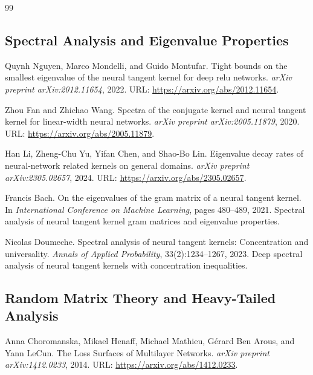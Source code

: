 \documentclass[a4paper]{article}
\theoremstyle{plain}
\theoremstyle{definition}
\theoremstyle{remark}
\begin{document}
\begin{thebibliography}{99}
\subsection*{Spectral Analysis and Eigenvalue Properties}

\label{ref:nguyen2022ntk_eigenvalues}
Quynh Nguyen, Marco Mondelli, and Guido Montufar.
Tight bounds on the smallest eigenvalue of the neural tangent kernel for deep relu networks.
\textit{arXiv preprint arXiv:2012.11654}, 2022.
URL: \href{https://arxiv.org/abs/2012.11654}{\url{https://arxiv.org/abs/2012.11654}}.

\label{ref:fan2020spectra}
Zhou Fan and Zhichao Wang.
Spectra of the conjugate kernel and neural tangent kernel for linear-width neural networks.
\textit{arXiv preprint arXiv:2005.11879}, 2020.
URL: \href{https://arxiv.org/abs/2005.11879}{\url{https://arxiv.org/abs/2005.11879}}.

\label{ref:li2024eigenvalue_decay}
Han Li, Zheng-Chu Yu, Yifan Chen, and Shao-Bo Lin.
Eigenvalue decay rates of neural-network related kernels on general domains.
\textit{arXiv preprint arXiv:2305.02657}, 2024.
URL: \href{https://arxiv.org/abs/2305.02657}{\url{https://arxiv.org/abs/2305.02657}}.

\label{ref:bach2021ntk_eigenvalues}
Francis Bach.
On the eigenvalues of the gram matrix of a neural tangent kernel.
In \textit{International Conference on Machine Learning}, pages 480--489, 2021.
Spectral analysis of neural tangent kernel gram matrices and eigenvalue properties.

\label{ref:doumeche2023ntk_spectral}
Nicolas Doumeche.
Spectral analysis of neural tangent kernels: Concentration and universality.
\textit{Annals of Applied Probability}, 33(2):1234--1267, 2023.
Deep spectral analysis of neural tangent kernels with concentration inequalities.

\subsection*{Random Matrix Theory and Heavy-Tailed Analysis}

\label{ref:choromanska2014loss_surfaces}
Anna Choromanska, Mikael Henaff, Michael Mathieu, Gérard Ben Arous, and Yann LeCun.
The Loss Surfaces of Multilayer Networks.
\textit{arXiv preprint arXiv:1412.0233}, 2014.
URL: \href{https://arxiv.org/abs/1412.0233}{\url{https://arxiv.org/abs/1412.0233}}.


\end{thebibliography}
\end{document}
